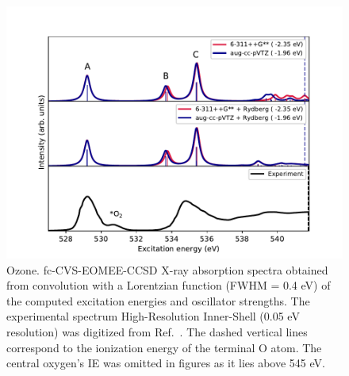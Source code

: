 \documentclass[journal=jctcce,manuscript=article]{achemso}
\begin{document}
\begin{figure}
  \includegraphics[width=1\textwidth]{Spectra/O3.pdf}  
  \caption{Ozone. fc-CVS-EOMEE-CCSD X-ray absorption spectra obtained from convolution with a Lorentzian function (FWHM = 0.4 eV) of the computed excitation energies and oscillator strengths. The experimental spectrum High-Resolution Inner-Shell (0.05 eV resolution) was digitized from Ref.~. The dashed vertical lines correspond to the ionization energy of the terminal O atom. The central oxygen's IE was omitted in figures as it lies above 545 eV.}
  \label{fgr:Ozone}
\end{figure}
\end{document}
